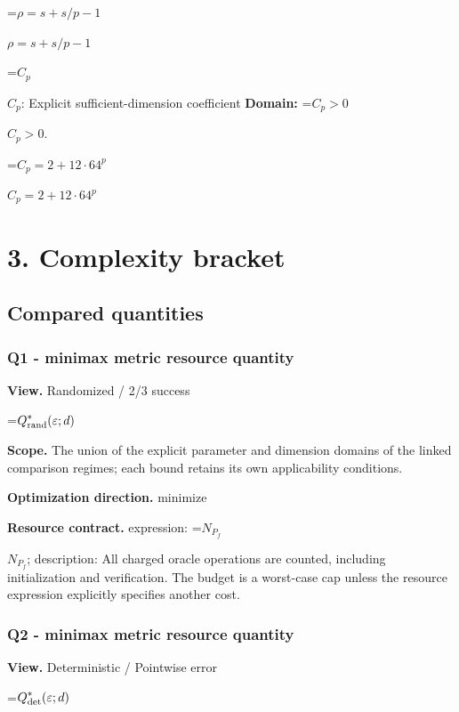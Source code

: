 \documentclass[10pt,a4paper]{article}
\newcommand{\AtlasMath}[1]{\par\begingroup\centering\setbox0=\hbox{$\displaystyle #1$}\ifdim\wd0>1.4\linewidth\typeout{ATLAS WIDE FORMULA: \the\wd0}\fi\ifdim\wd0>\linewidth\resizebox{\linewidth}{!}{\box0}\else\box0\fi\par\endgroup}
\newcommand{\AtlasInlineMath}[1]{\begingroup\setbox0=\hbox{$#1$}\ifdim\wd0>.4\linewidth\endgroup\AtlasMath{#1}\else\endgroup$#1$\fi}
\begin{document}
\AtlasInlineMath{\rho=s+s/p-1}



\AtlasInlineMath{C_p}: Explicit sufficient-dimension coefficient \textbf{Domain:} \AtlasInlineMath{C_p>0}.



\AtlasInlineMath{C_p=2+12\cdot64^p}



\section{3. Complexity bracket}


\subsection{Compared quantities}


\subsubsection{Q1 - minimax metric resource quantity}


\textbf{View.} Randomized / 2/3 success



\AtlasMath{Q^*_{\rm rand}(\varepsilon;d)}


\textbf{Scope.} The union of the explicit parameter and dimension domains of the linked comparison regimes; each bound retains its own applicability conditions.



\textbf{Optimization direction.} minimize



\textbf{Resource contract.} expression: \AtlasInlineMath{N_{P_f}}; description: All charged oracle operations are counted, including initialization and verification. The budget is a worst-case cap unless the resource expression explicitly specifies another cost.



\subsubsection{Q2 - minimax metric resource quantity}


\textbf{View.} Deterministic / Pointwise error



\AtlasMath{Q^*_{\rm det}(\varepsilon;d)}
\end{document}
